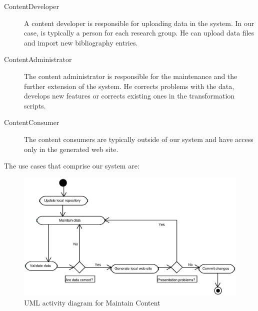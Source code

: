 \documentclass[10pt]{article}
\begin{document}
\begin{description}
\item[ContentDeveloper] A content developer is responsible for uploading data in the system. 
In our case, is typically a person for each research group. He can upload data files and 
import new bibliography entries.

\item[ContentAdministrator] The content administrator is responsible for the maintenance 
and the further extension of the system. He corrects problems with the data, develops 
new features or corrects existing ones in the transformation scripts.

\item[ContentConsumer] The content consumers are typically outside of our system
and have access only in the generated web site.
\end{description}

The use cases that comprise our system are:

\begin{figure}
\includegraphics[scale=0.6]{maintain-content-activity}
\caption{UML activity diagram for Maintain Content}
\label{fig:maintain-content-diagram}
\end{figure}
\end{document}
